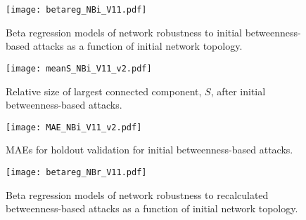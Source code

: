 
\begin{figure}[!htp]
\begin{center}
\texttt{[image: betareg\_NBi\_V11.pdf]}
\caption{\label{fig:ch2:betaregNBi}Beta regression models of network robustness to initial betweenness-based attacks as a function of initial network topology.}
\end{center}
\end{figure}



\begin{figure}[!htp]
\begin{center}
\texttt{[image: meanS\_NBi\_V11\_v2.pdf]}
\caption{\label{fig:ch2:meanSNBi}Relative size of largest connected component, $S$, after initial betweenness-based attacks.}
\end{center}
\end{figure}



\begin{figure}[!htp]
\begin{center}
\texttt{[image: MAE\_NBi\_V11\_v2.pdf]}
\caption{\label{fig:ch2:maeNBi}MAEs for holdout validation for initial betweenness-based attacks.}
\end{center}
\end{figure}



\begin{figure}[!htp]
\begin{center}
\texttt{[image: betareg\_NBr\_V11.pdf]}
\caption{\label{fig:ch2:betaregNBr}Beta regression models of network robustness to recalculated betweenness-based attacks as a function of initial network topology.}
\end{center}
\end{figure}

